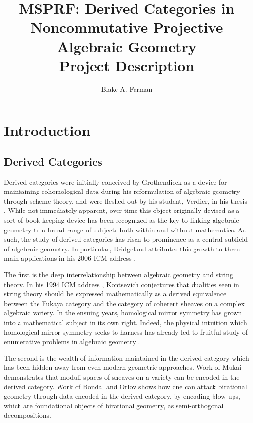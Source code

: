 \documentclass[11pt]{article}
\title{MSPRF: Derived Categories in Noncommutative Projective Algebraic Geometry\\\small{Project Description}}
\author{Blake A. Farman}
\date{}
\begin{document}
\maketitle

\section{Introduction}
\subsection{Derived Categories}
Derived categories were initially conceived by Grothendieck as a device for maintaining cohomological data during his reformulation of algebraic geometry through scheme theory, and were fleshed out by his student, Verdier, in his thesis \cite{Verdier}.
While not immediately apparent, over time this object originally devised as a sort of book keeping device has been recognized as the key to linking algebraic geometry to a broad range of subjects both within and without mathematics.
As such, the study of derived categories has risen to prominence as a central subfield of algebraic geometry.
In particular, Bridgeland attributes this growth to three main applications in his 2006 ICM address \cite{Bridgeland06}.

The first is the deep interrelationship between algebraic geometry and string theory.
In his 1994 ICM address \cite{Kontsevich}, Kontsevich conjectures that dualities seen in string theory should be expressed mathematically as a derived equivalence between the Fukaya category and the category of coherent sheaves on a complex algebraic variety.
In the ensuing years, homological mirror symmetry has grown into a mathematical subject in its own right.
Indeed, the physical intuition which homological mirror symmetry seeks to harness has already led to fruitful study of enumerative problems in algebraic geometry \cite{enumerative}.

The second is the wealth of information maintained in the derived category which has been hidden away from even modern geometric approaches.
Work of Mukai \cite{Mukai81,Mukai87} demonstrates that moduli spaces of sheaves on a variety can be encoded in the derived category.
Work of Bondal and Orlov \cite{Bondal-Orlov} shows how one can attack birational geometry through data encoded in the derived category, by encoding blow-ups, which are foundational objects of birational geometry, as semi-orthogonal decompositions.
\end{document}
